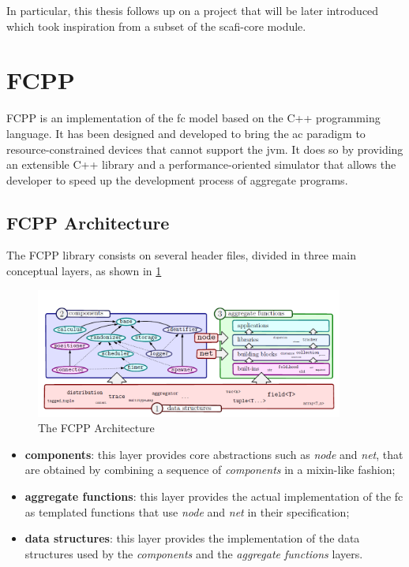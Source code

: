 In particular, this thesis follows up on a project that will be later introduced which took inspiration from a subset of the scafi-core module.

\section{FCPP}
FCPP \cite{9196401} is an implementation of the \ac{fc} model based on the C++ programming language. It has been designed and developed to bring the \ac{ac} paradigm to resource-constrained devices that cannot support the \ac{jvm}.
It does so by providing an extensible C++ library and a performance-oriented simulator that allows the developer to speed up the development process of aggregate programs.

\subsection*{FCPP Architecture}
The FCPP library consists on several header files, divided in three main conceptual layers, as shown in \cref{fig:fcpp-architecture}

\begin{figure}[h]
    \centering
    \includegraphics[width=0.9\textwidth]{figures/fcpp-architecture.png}
    \caption{The FCPP Architecture}
    \label{fig:fcpp-architecture}
\end{figure}

\begin{itemize}
    \item \textbf{components}: this layer provides core abstractions such as \textit{node} and \textit{net}, that are obtained by combining a sequence of \textit{components} in a mixin-like fashion;
    \item \textbf{aggregate functions}: this layer provides the actual implementation of the \ac{fc} as templated functions that use \textit{node} and \textit{net} in their specification;
    \item \textbf{data structures}: this layer provides the implementation of the data structures used by the \textit{components} and the \textit{aggregate functions} layers.
\end{itemize}

